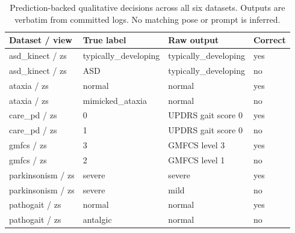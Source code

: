 \begin{table}[H]\centering\small
\caption{Prediction-backed qualitative decisions across all six datasets. Outputs are verbatim from committed logs. No matching pose or prompt is inferred.}
\begin{tabular}{llll}\toprule Dataset / view & True label & Raw output & Correct\\\midrule
asd\_kinect / zs & typically\_developing & typically\_developing & yes\\
asd\_kinect / zs & ASD & typically\_developing & no\\
ataxia / zs & normal & normal & yes\\
ataxia / zs & mimicked\_ataxia & normal & no\\
care\_pd / zs & 0 & UPDRS gait score 0 & yes\\
care\_pd / zs & 1 & UPDRS gait score 0 & no\\
gmfcs / zs & 3 & GMFCS level 3 & yes\\
gmfcs / zs & 2 & GMFCS level 1 & no\\
parkinsonism / zs & severe & severe & yes\\
parkinsonism / zs & severe & mild & no\\
pathogait / zs & normal & normal & yes\\
pathogait / zs & antalgic & normal & no\\
\bottomrule\end{tabular}\end{table}